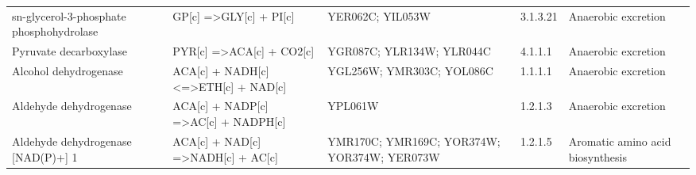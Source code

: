 \begin{table}[H]
\begin{center}
{\begin{tabular}{p{11cm}p{17cm}p{8cm}lp{5cm}}
sn-glycerol-3-phosphate phosphohydrolase                                                  & GP{[}c{]} =\textgreater GLY{[}c{]} + PI{[}c{]}                                                                                                  & YER062C; YIL053W                                                                                                                                                 & 3.1.3.21           & Anaerobic excretion                                                         \\
Pyruvate decarboxylase                                                                    & PYR{[}c{]} =\textgreater ACA{[}c{]} + CO2{[}c{]}                                                                                                & YGR087C; YLR134W; YLR044C                                                                                                                                        & 4.1.1.1            & Anaerobic excretion                                                         \\
Alcohol dehydrogenase                                                                     & ACA{[}c{]} + NADH{[}c{]} \textless{}=\textgreater ETH{[}c{]} + NAD{[}c{]}                                                                       & YGL256W; YMR303C; YOL086C                                                                                                                                        & 1.1.1.1            & Anaerobic excretion                                                         \\
Aldehyde dehydrogenase                                                                    & ACA{[}c{]} + NADP{[}c{]} =\textgreater AC{[}c{]} + NADPH{[}c{]}                                                                                 & YPL061W                                                                                                                                                          & 1.2.1.3            & Anaerobic excretion                                                         \\
Aldehyde dehydrogenase {[}NAD(P)+{]} 1                                                    & ACA{[}c{]} + NAD{[}c{]} =\textgreater NADH{[}c{]} + AC{[}c{]}                                                                                   & YMR170C; YMR169C; YOR374W; YOR374W; YER073W                                                                                                                      & 1.2.1.5            & Aromatic amino acid biosynthesis \\

\end{tabular}}
\end{center}
\end{table}
